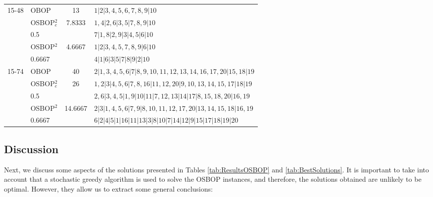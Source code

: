 \documentclass[preprint,12pt]{article}
\theoremstyle{definition}
\theoremstyle{remark}
\theoremstyle{example} %
\begin{document}
\begin{table}
\begin{scriptsize}
\begin{tabular}{llcl}
15-48 &	OBOP    &   13   &          $1|2|3,4,5,6,7,8,9|10$	\\  \cline{2-4}
    &   OSBOP$^2_e$  &   7.8333   & $1,4|2,6|3,5|7,8,9|10$ \\
    &   0.5    &           &        $7|1,8|2,9|3|4,5|6|10$ \\ \cline{2-4}
    &   OSBOP$^2$   &   4.6667   &  $1|2|3,4,5,7,8,9|6|10$  \\
    &   0.6667        &       &     $4|1|6|3|5|7|8|9|2|10$  \\\hline
    
15-74 &	OBOP    &   40   &          $2|1,3,4,5,6|7|8,9,10,11,12,13,14,16,17,20|15,18|19$	\\  \cline{2-4}
    &   OSBOP$^2_e$  &   26   &     $1,2|3|4,5,6|7,8,16|11,12,20|9,10,13,14,15,17|18|19$ \\
    &   0.5    &           &        $2,6|3,4,5|1,9|10|11|7,12,13|14|17|8,15,18,20|16,19$ \\ \cline{2-4}
    &   OSBOP$^2$   &   14.6667   & $2|3|1,4,5,6|7,9|8,10,11,12,17,20|13,14,15,18|16,19$  \\
    &   0.6667        &       &     $6|2|4|5|1|16|11|13|3|8|10|7|14|12|9|15|17|18|19|20$  \\\hline
\end{tabular}
\end{scriptsize}
\end{table}

\subsection{Discussion}

Next, we discuss some aspects of the solutions presented in Tables \ref{tab:ResultsOSBOP} and \ref{tab:BestSolutions}.
It is important to take into account that a stochastic greedy algorithm is used to solve the OSBOP instances, and therefore, the solutions obtained are unlikely to be optimal. However, they allow us to extract some general conclusions:
\end{document}

